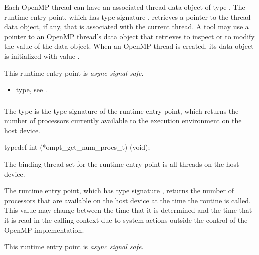 \descr
Each OpenMP thread can have an associated thread data object of type 
. The  runtime entry point, 
which has type signature , retrieves a pointer 
to the thread data object, if any, that is associated with the current thread. 
A tool may use a pointer to an OpenMP thread's data object that 
 retrieves to inspect or to modify the value of 
the data object. When an OpenMP thread is created, its data object is
initialized with value .

This runtime entry point is \emph{async signal safe}.

\crossreferences
\begin{itemize}
\item {} type, see .
\end{itemize}



\subsubsection{}
\label{sec:ompt_get_num_procs_t}

\summary
The  type is the type signature of the 
 runtime entry point, which returns the
number of processors currently available to the execution environment 
on the host device.

\format
\begin{ccppspecific}
\begin{omptInquiry}
typedef int (*ompt_get_num_procs_t) (void);
\end{omptInquiry}
\end{ccppspecific}

\binding
The binding thread set for the  runtime entry 
point is all threads on the host device.

\descr
The  runtime entry point, which has type 
signature  , returns the number of processors 
that are available on the host device at the time the routine is called. 
This value may change between the time that it is determined and the 
time that it is read in the calling context due to system actions 
outside the control of the OpenMP implementation.

This runtime entry point is \emph{async signal safe}.




